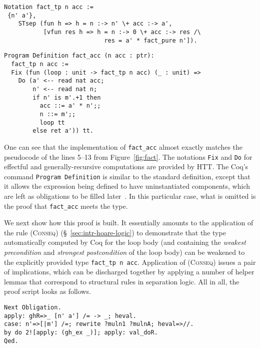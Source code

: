 \documentclass[blockstyle,preprint]{sigplanconf}
\newcommand{\code}[1]{\lstinline{#1}}
\begin{document}

\begin{lstlisting}
Notation fact_tp n acc := 
 {n' a'}, 
    STsep (fun h => h = n :-> n' \+ acc :-> a',
           [vfun res h => h = n :-> 0 \+ acc :-> res /\ 
                            res = a' * fact_pure n']).
\end{lstlisting}

\begin{lstlisting}
Program Definition fact_acc (n acc : ptr): 
  fact_tp n acc := 
  Fix (fun (loop : unit -> fact_tp n acc) (_ : unit) => 
    Do (a' <-- read nat acc;
        n' <-- read nat n;
        if n' is m'.+1 then 
          acc ::= a' * n';; 
          n ::= m';;
          loop tt
        else ret a')) tt.
\end{lstlisting}

%
One can see that the implementation of \code{fact_acc} almost exactly
matches the pseudocode of the lines 5--13 from
Figure~\ref{fig:fact}. The notations \code{Fix} and \code{Do} for
effectful and generally-recursive computations are provided by HTT.
%
The Coq's command \code{Program Definition} is similar to the standard
definition, except that it allows the expression being defined to have
uninstantiated components, which are left as obligations to be filled
later~\cite{Sozeau:TYPES06}. In this particular case, what is omitted
is the proof that \code{fact_acc} meets the type. 
%

We next show how this proof is built. It essentially amounts to the
application of the rule \textsc{(Conseq)}
(\S~\ref{sec:intr-hoare-logic}) to demonstrate that the type
automatically computed by Coq for the loop body (and containing the
\emph{weakest precondition} and \emph{strongest postcondition} of the
loop body) can be weakened to the explicitly provided type
\code{fact_tp n acc}. Application of \textsc{(Conseq)} issues a pair
of implications, which can be discharged together by applying a number
of helper lemmas that correspond to structural rules in separation
logic. All in all, the proof script looks as follows.
\begin{lstlisting}
Next Obligation.
apply: ghR=>_ [n' a'] /= -> _; heval.
case: n'=>[|m'] /=; rewrite ?muln1 ?mulnA; heval=>//.
by do 2![apply: (gh_ex _)]; apply: val_doR. 
Qed.
\end{lstlisting}
%
\end{document}
